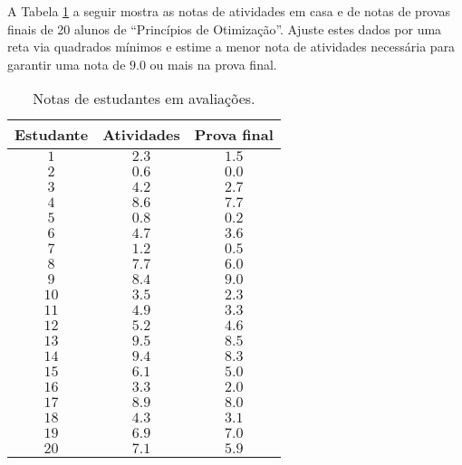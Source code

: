 
\begin{problem}
A Tabela \ref{tab_notas} a seguir mostra as notas de atividades em casa e de notas de provas finais de 20 alunos de ``Princípios de Otimização''. Ajuste estes dados por uma reta via quadrados mínimos e estime a menor nota de atividades necessária para garantir uma nota de $9.0$ ou mais na prova final.
\end{problem}

		\begin{table}[tb]
		\begin{center}
		\begin{tabular}{|c||c|c|}
			\hline
			Estudante & Atividades & Prova final\\
			\hline
			\hline
			$1$ & $2.3$ & $1.5$\\
			$2$ & $0.6$ & $0.0$\\
			$3$ & $4.2$ & $2.7$\\
			$4$ & $8.6$ & $7.7$\\
			$5$ & $0.8$ & $0.2$\\
			$6$ & $4.7$ & $3.6$\\
			$7$ & $1.2$ & $0.5$\\
			$8$ & $7.7$ & $6.0$\\
			$9$ & $8.4$ & $9.0$\\
			$10$ & $3.5$ & $2.3$\\
			$11$ & $4.9$ & $3.3$\\
			$12$ & $5.2$ & $4.6$\\
			$13$ & $9.5$ & $8.5$\\
			$14$ & $9.4$ & $8.3$\\
			$15$ & $6.1$ & $5.0$\\
			$16$ & $3.3$ & $2.0$\\
			$17$ & $8.9$ & $8.0$\\
			$18$ & $4.3$ & $3.1$\\
            $19$ & $6.9$ & $7.0$\\
            $20$ & $7.1$ & $5.9$ \\
			\hline
		\end{tabular}\\
		\end{center}
		\label{tab_notas}
        \caption{Notas de estudantes em avaliações.}
		\end{table}


